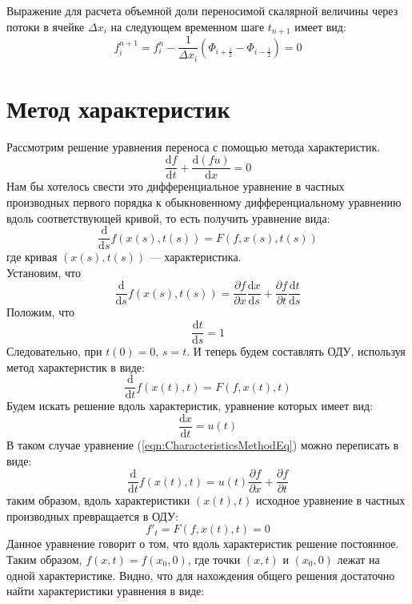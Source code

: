 \documentclass[10pt,a4paper]{article}
\begin{document}
Выражение для расчета объемной доли переносимой скалярной величины через потоки в ячейке $\Delta x_i$ на следующем временном шаге $t_{n+1}$ имеет вид:
\begin{equation}
\label{fiNextFlows}
f_i^{n+1}=f_i^n
-
\frac{1}{\Delta x_i} (
\Phi_{i+\frac{1}{2}}
-
\Phi_{i-\frac{1}{2}}
)=0
\end{equation}



\section{Метод характеристик}
\begin{comment}
https://ru.wikipedia.org/wiki/%
\end{comment}
Рассмотрим решение уравнения переноса с помощью метода характеристик.
\begin{equation}
\frac{\text{d}f}{\text{d}t} + \frac{\text{d}(f u)}{\text{d}x}=0
\end{equation}
Нам бы хотелось свести это дифференциальное уравнение в частных производных первого порядка к обыкновенному дифференциальному уравнению вдоль соответствующей кривой, то есть получить уравнение вида:
\[
\frac{\text{d}}{\text{d}s}f(x(s),t(s))=F(f,x(s),t(s))
\]
где кривая $(x(s),t(s))$ — характеристика.\\
Установим, что
\begin{equation}
\label{eqn:CharacteristicsMethodEq}
\frac{\text{d}}{\text{d}s}f(x(s),t(s))=\frac{\partial f}{\partial x}\frac{\text{d}x}{\text{d}s}+\frac{\partial f}{\partial t}\frac{\text{d}t}{\text{d}s}
\end{equation}
Положим, что
\[
\frac{\text{d}t}{\text{d}s}=1
\]
Следовательно, при $t(0)=0$, $s=t$. И теперь будем составлять ОДУ, используя метод характеристик в виде:
\[
\frac{\text{d}}{\text{d}t}f(x(t),t)=F(f,x(t),t)
\]
Будем искать решение вдоль характеристик, уравнение которых имеет вид:
\[
\frac{\text{d}x}{\text{d}t}=u(t)
\]
В таком случае уравнение (\ref{eqn:CharacteristicsMethodEq}) можно переписать в виде:
\[
\frac{\text{d}}{\text{d}t}f(x(t),t)=u(t)\frac{\partial f}{\partial x}+\frac{\partial f}{\partial t}
\]
таким образом, вдоль характеристики $(x(t),t)$ исходное уравнение в частных производных превращается в ОДУ:
\[
f'_t=F(f,x(t),t)=0
\]
Данное уравнение говорит о том, что вдоль характеристик решение постоянное. Таким образом, $f(x,t)=f(x_0,0)$, где точки $(x,t)$ и $(x_0,0)$ лежат на одной характеристике. Видно, что для нахождения общего решения достаточно найти характеристики уравнения в виде:
\end{document}
